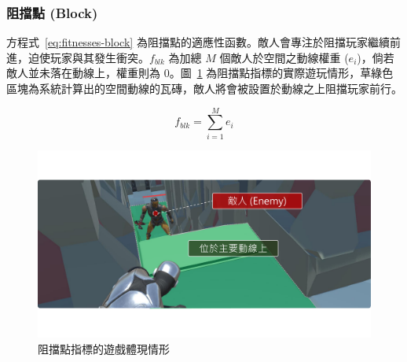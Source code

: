 \subsubsection{阻擋點 (Block)}
\label{sssec:method-segments-fitnesses-block}

方程式~\ref{eq:fitnesses-block} 為阻擋點的適應性函數。敵人會專注於阻擋玩家繼續前進，迫使玩家與其發生衝突。$f_{blk}$ 為加總 $M$ 個敵人於空間之動線權重 ($e_{i}$)，倘若敵人並未落在動線上，權重則為 $0$。圖~\ref{fig:fitnesses-block-gameplay} 為阻擋點指標的實際遊玩情形，草綠色區塊為系統計算出的空間動線的瓦磚，敵人將會被設置於動線之上阻擋玩家前行。

\begin{equation}
    \label{eq:fitnesses-block}
    f_{blk} = \sum_{i=1}^{M} e_{i}
\end{equation}

\begin{figure}[!htb]
  \begin{center}
    \includegraphics[width=1.0\textwidth]{figures/fitnesses-block-gameplay.pdf}
    \caption{阻擋點指標的遊戲體現情形}
    \label{fig:fitnesses-block-gameplay}
  \end{center}
\end{figure}



